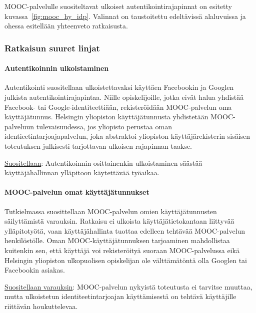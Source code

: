 \documentclass[finnish,gradu]{tktltiki}
\begin{document}
  MOOC-palvelulle suositeltavat ulkoiset autentikointirajapinnat on esitetty kuvassa~\ref{fig:mooc_hy_idp}. Valinnat on taustoitettu edeltävissä alaluvuissa ja ohessa esitellään yhteenveto ratkaisusta.


  \subsubsection{Ratkaisun suuret linjat} %
  \label{ssub:ratkaisun_suuret_linjat}

  \paragraph{Autentikoinnin ulkoistaminen} \hfill  %
  \label{par:autentikoinnin_ulkoistaminen}

  Autentikointi suositellaan ulkoistettavaksi käyttäen Facebookin ja Googlen julkista autentikointirajapintaa. Niille opiskelijoille, jotka eivät halua yhdistää Facebook- tai Google-identiteettiään, rekisteröidään MOOC-palvelun oma käyttäjätunnus. Helsingin yliopiston käyttäjätunnusta yhdistetään MOOC-palveluun tulevaisuudessa, jos yliopisto perustaa oman identieetintarjoajapalvelun, joka abstraktoi yliopiston käyttäjärekisterin sisäisen toteutuksen julkisesti tarjottavan ulkoisen rajapinnan taakse.

  \underline{Suositellaan}: Autentikoinnin osittainenkin ulkoistaminen säästää käyttäjähallinnan ylläpitoon käytettävää työaikaa.

  \paragraph{MOOC-palvelun omat käyttäjätunnukset} \hfill %
  \label{par:mooc_palvelun_omat_käyttäjätunnukset}

  Tutkielmassa suosittellaan MOOC-palvelun omien käyttäjätunnusten säilyttämistä varauksin. Ratkaisu ei ulkoista käyttäjätietokantaan liittyvää ylläpitotyötä, vaan käyttäjähallinta tuottaa edelleen tehtävää MOOC-palvelun henkilöstölle. Oman MOOC-käyttäjätunnuksen tarjoaminen mahdollistaa kuitenkin sen, että käyttäjä voi rekisteröityä suoraan MOOC-palvelussa eikä Helsingin yliopiston ulkopuolisen opiskelijan ole välttämätöntä olla Googlen tai Facebookin asiakas.

  \underline{Suositellaan varauksin}: MOOC-palvelun nykyistä toteutusta ei tarvitse muuttaa, mutta ulkoistetun identiteetintarjoajan käyttämisestä on tehtävä käyttäjille riittävän houkuttelevaa.
\end{document}
